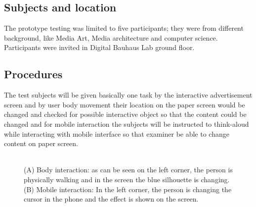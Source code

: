 \subsection{Subjects and location}
The prototype testing was limited to five participants; they were from different background, like Media Art, Media architecture and computer science. Participants were invited in Digital Bauhaus Lab ground floor.


\subsection{Procedures}
The test subjects will be given basically one task by the interactive advertisement screen and by user body movement their location on the paper screen would be changed and checked for possible interactive object so that the content could be changed and for mobile interaction the subjects will be instructed to think-aloud while interacting with mobile interface so that examiner be able to change content on paper screen.

\begin{figure}[H]
    \centering
    \caption{\\(A) Body interaction: as can be seen on the left corner, the person is physically walking and in the screen the blue silhouette is changing.\\ (B) Mobile interaction: In the left corner, the person is changing the cursor in the phone and the effect is shown on the screen.}%
    \label{fig:Interactive_prototype}%
\end{figure}



